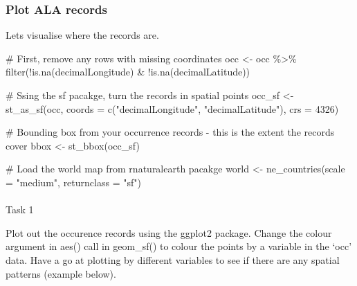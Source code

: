 \documentclass[
  letterpaper,
  DIV=11,
  numbers=noendperiod]{scrartcl}
\makeatletter
\let\oldparagraph\paragraph
\renewcommand{\paragraph}{
    \@ifstar
      \xxxParagraphStar
      \xxxParagraphNoStar
  }
\newcommand{\xxxParagraphStar}[1]{\oldparagraph*{#1}\mbox{}}
\newcommand{\xxxParagraphNoStar}[1]{\oldparagraph{#1}\mbox{}}
\newenvironment{Shaded}{\begin{snugshade}}{\end{snugshade}}
\newcommand{\AttributeTok}[1]{\textcolor[rgb]{0.40,0.45,0.13}{#1}}
\newcommand{\CommentTok}[1]{\textcolor[rgb]{0.37,0.37,0.37}{#1}}
\newcommand{\DecValTok}[1]{\textcolor[rgb]{0.68,0.00,0.00}{#1}}
\newcommand{\FunctionTok}[1]{\textcolor[rgb]{0.28,0.35,0.67}{#1}}
\newcommand{\NormalTok}[1]{\textcolor[rgb]{0.00,0.23,0.31}{#1}}
\newcommand{\OtherTok}[1]{\textcolor[rgb]{0.00,0.23,0.31}{#1}}
\newcommand{\SpecialCharTok}[1]{\textcolor[rgb]{0.37,0.37,0.37}{#1}}
\newcommand{\StringTok}[1]{\textcolor[rgb]{0.13,0.47,0.30}{#1}}
\makeatother
\begin{document}
\subsubsection{Plot ALA records}\label{plot-ala-records}

Lets visualise where the records are.

\begin{Shaded}
\begin{Highlighting}[]
\CommentTok{\# First, remove any rows with missing coordinates}
\NormalTok{occ }\OtherTok{\textless{}{-}}\NormalTok{ occ }\SpecialCharTok{\%\textgreater{}\%}
  \FunctionTok{filter}\NormalTok{(}\SpecialCharTok{!}\FunctionTok{is.na}\NormalTok{(decimalLongitude) }\SpecialCharTok{\&} \SpecialCharTok{!}\FunctionTok{is.na}\NormalTok{(decimalLatitude))}

\CommentTok{\# Ssing the sf pacakge, turn the records in spatial points }
\NormalTok{occ\_sf }\OtherTok{\textless{}{-}} \FunctionTok{st\_as\_sf}\NormalTok{(occ, }\AttributeTok{coords =} \FunctionTok{c}\NormalTok{(}\StringTok{"decimalLongitude"}\NormalTok{, }\StringTok{"decimalLatitude"}\NormalTok{), }\AttributeTok{crs =} \DecValTok{4326}\NormalTok{)}

\CommentTok{\# Bounding box from your occurrence records {-} this is the extent the records cover}
\NormalTok{bbox }\OtherTok{\textless{}{-}} \FunctionTok{st\_bbox}\NormalTok{(occ\_sf)}

\CommentTok{\# Load the world map from rnaturalearth pacakge}
\NormalTok{world }\OtherTok{\textless{}{-}} \FunctionTok{ne\_countries}\NormalTok{(}\AttributeTok{scale =} \StringTok{"medium"}\NormalTok{, }\AttributeTok{returnclass =} \StringTok{"sf"}\NormalTok{)}
\end{Highlighting}
\end{Shaded}

\paragraph{Task 1}\label{task-1}

Plot out the occurence records using the ggplot2 package. Change the
colour argument in aes() call in geom\_sf() to colour the points by a
variable in the `occ' data. Have a go at plotting by different variables
to see if there are any spatial patterns (example below).
\end{document}
